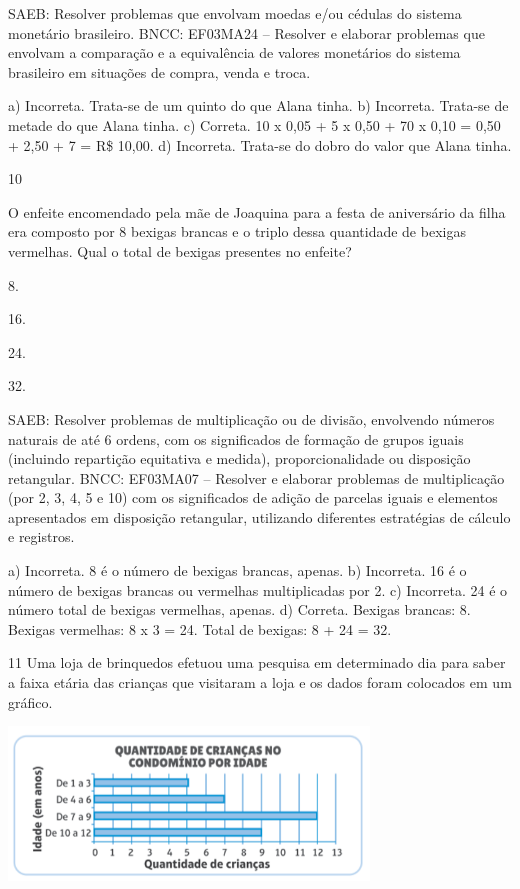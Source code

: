 {\begin{escolha}
{SAEB: Resolver problemas que envolvam moedas e/ou cédulas do sistema monetário brasileiro.
BNCC: EF03MA24 -- Resolver e elaborar problemas que envolvam a comparação e a equivalência de
valores monetários do sistema brasileiro em situações de compra, venda e troca.

a) Incorreta. Trata-se de um quinto do que Alana tinha.
b) Incorreta. Trata-se de metade do que Alana tinha.
c) Correta. 10 x 0,05 + 5 x 0,50 + 70 x 0,10 = 0,50 + 2,50 + 7 = R\$ 10,00.
d) Incorreta. Trata-se do dobro do valor que Alana tinha.

\num{10}

O enfeite encomendado pela mãe de Joaquina para a festa de aniversário da filha era composto por 8 bexigas brancas e o triplo dessa quantidade de bexigas vermelhas. Qual o total de bexigas presentes no enfeite?

\begin{escolha}

\item
  8.
\item
  16.
\item
  24.
\item
  32.
\end{escolha}

SAEB: Resolver problemas de multiplicação ou de divisão, envolvendo números naturais de até 6 ordens, com os significados de formação de grupos iguais (incluindo repartição equitativa e medida), proporcionalidade ou disposição retangular.
BNCC: EF03MA07 – Resolver e elaborar problemas de multiplicação (por 2, 3, 4, 5 e 10) com os significados de adição de parcelas iguais e elementos apresentados em disposição retangular, utilizando diferentes estratégias de cálculo e registros.

a) Incorreta. 8 é o número de bexigas brancas, apenas.
b) Incorreta. 16 é o número de bexigas brancas ou vermelhas multiplicadas por 2.
c) Incorreta. 24 é o número total de bexigas vermelhas, apenas.
d) Correta. Bexigas brancas: 8. Bexigas vermelhas: 8 x 3 = 24. Total de bexigas: 8 + 24 = 32.

\num{11} Uma loja de brinquedos efetuou uma pesquisa em determinado dia para saber a faixa etária das crianças que visitaram a loja e os dados foram
colocados em um gráfico.


\includegraphics[width=3.77564in,height=1.60972in]{media/image136.png}

}
\end{escolha}}

